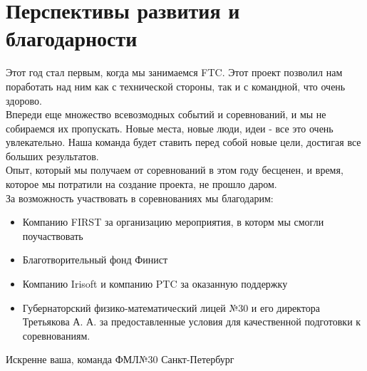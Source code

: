 \section{Перспективы развития и благодарности}

   \raggedright  Этот год стал первым, когда мы занимаемся FTC. Этот проект позволил нам поработать над ним как с технической стороны, так и с командной, что очень здорово.\\ 

    Впереди еще множество всевозмодных событий и соревнований, и мы не собираемся их пропускать. Новые места, новые люди, идеи - все это очень увлекательно. Наша команда будет ставить перед собой новые цели, достигая все больших результатов.\\ 

    Опыт, который мы получаем от соревнований в этом году бесценен, и время, которое мы потратили на создание проекта, не прошло даром.\\ 

    За возможность участвовать в соревнованиях мы благодарим:
	\begin{itemize}
		\item Компанию FIRST за организацию мероприятия, в которм мы смогли поучаствовать
		\item Благотворительный фонд Финист
		\item Компанию Irisoft и компанию PTC за оказанную поддержку
		\item Губернаторский физико-математический лицей №30 и его директора Третьякова А. А. за предоставленные условия для качественной подготовки к соревнованиям.
	\end{itemize}
   	
    \begin{center}
      Искренне ваша, команда ФМЛ№30 Санкт-Петербург
    \end{center}

